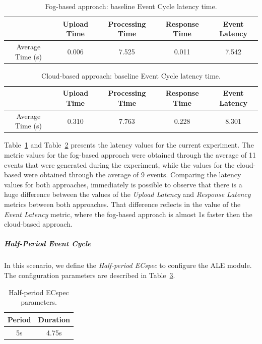 \begin{table}[ht!]
  \begin{tabular}{|c|c|c|c|c|}
  \hline
  ~                & Upload Time & Processing Time & Response Time & Event Latency \\ \hline
  Average Time (s) & 0.006       & 7.525           & 0.011         & 7.542         \\ \hline
  \end{tabular}
  \caption{Fog-based approach: baseline Event Cycle latency time.}
  \label{table:ecspec_local}
\end{table}

\begin{table}[ht!]
  \begin{tabular}{|c|c|c|c|c|}
  \hline
  ~                & Upload Time & Processing Time & Response Time & Event Latency \\ \hline
  Average Time (s) & 0.310       & 7.763           & 0.228         &  8.301        \\ \hline
  \end{tabular}
  \caption{Cloud-based approach: baseline Event Cycle latency time.}
  \label{table:ecspec_cloud}
\end{table}

Table~\ref{table:ecspec_local} and Table~\ref{table:ecspec_cloud} presents the latency values for the
current experiment. The metric values for the fog-based approach were obtained through the average
of 11 events that were generated during the experiment, while the values for the cloud-based were
obtained through the average of 9 events. Comparing the latency values for both approaches,
immediately is possible to observe that there is a huge difference between the values of the
\textit{Upload Latency} and \textit{Response Latency} metrics between both approaches. That
difference reflects in the value of the \textit{Event Latency} metric, where the fog-based approach
is almost 1s faster then the cloud-based approach.

\subparagraph{Half-Period Event Cycle}
\label{subp:eval_exp_latency_ecspec_fast}
In this scenario, we define the \textit{Half-period ECspec} to configure the \gls{ALE} module.
The configuration parameters are described in Table~\ref{table:ecspec_fast}.

\begin{table}[ht!]
  \begin{tabular}{|c|c|}
    \hline
    Period & Duration \\ \hline
    5s    & 4.75s     \\ \hline
  \end{tabular}
  \caption{Half-period ECspec parameters.}
  \label{table:ecspec_fast}
\end{table}

